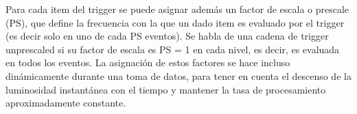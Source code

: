 Para cada item del trigger se puede asignar además un factor de escala o prescale (PS), que define la frecuencia con la que un dado item es evaluado por el trigger (es decir solo en uno de cada PS eventos). Se habla de una cadena de trigger unprescaled si su factor de escala es PS = 1 en cada nivel, es decir, es evaluada en todos los eventos. La asignación de estos factores se hace incluso dinámicamente durante una toma de datos, para tener en cuenta el descenso de la luminosidad instantánea con el tiempo y mantener la tasa de procesamiento aproximadamente constante.
